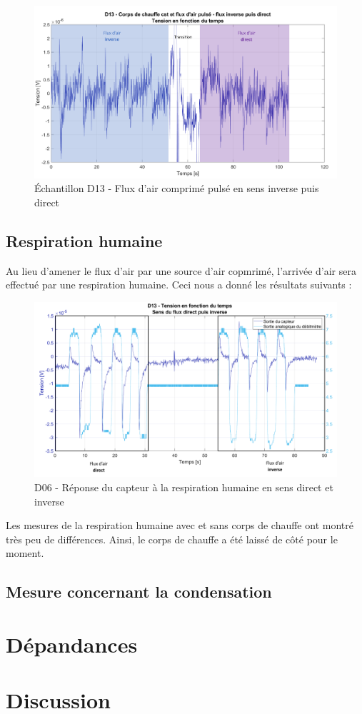 \begin{figure}[H]
    \centering
    \includegraphics[scale = 0.6]{assets/figures/D13_air_comprime_pulse_blue.pdf}
    \caption*{Échantillon D13 - Flux d'air comprimé pulsé en sens inverse puis direct}
    \label{fig:D13_air_comp_pulse}
\end{figure}

\subsection{Respiration humaine}
Au lieu d'amener le flux d'air par une source d'air copmrimé, l'arrivée d'air sera effectué par une respiration humaine. Ceci nous a donné les résultats suivants :

\begin{figure}[H]
    \centering
    \includegraphics[scale = 0.6]{assets/figures/D13_human_breath_direct_invert_blue.pdf}
    \caption{D06 - Réponse du capteur à la respiration humaine en sens direct et inverse}
    \label{fig:D13_human_breath_direct_invert}
\end{figure}

Les mesures de la respiration humaine avec et sans corps de chauffe ont montré très peu de différences. Ainsi, le corps de chauffe a été laissé 
de côté pour le moment. 

\subsection{Mesure concernant la condensation}

\section{Dépandances}
\section{Discussion}